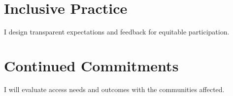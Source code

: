 \documentclass[type=diversity, medium=print]{careerdossier-statement}
\begin{document}
\MakeCDossierStatementHeader

\section*{Inclusive Practice}

I design transparent expectations and feedback for equitable participation.

\newpage

\section*{Continued Commitments}

I will evaluate access needs and outcomes with the communities affected.
\end{document}
